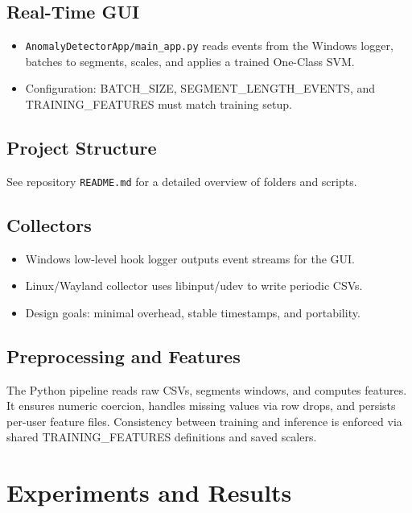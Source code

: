 \documentclass[
  12pt,
]{article}
\providecommand{\tightlist}{%
  \setlength{\itemsep}{0pt}\setlength{\parskip}{0pt}}
\begin{document}
\subsection{Real-Time GUI}\label{real-time-gui}

\begin{itemize}
\tightlist
\item
  \texttt{AnomalyDetectorApp/main\_app.py} reads events from the Windows
  logger, batches to segments, scales, and applies a trained One-Class
  SVM.
\item
  Configuration: BATCH\_SIZE, SEGMENT\_LENGTH\_EVENTS, and
  TRAINING\_FEATURES must match training setup.
\end{itemize}

\subsection{Project Structure}\label{project-structure}

See repository \texttt{README.md} for a detailed overview of folders and
scripts.

\subsection{Collectors}\label{collectors}

\begin{itemize}
\tightlist
\item
  Windows low-level hook logger outputs event streams for the GUI.
\item
  Linux/Wayland collector uses libinput/udev to write periodic CSVs.
\item
  Design goals: minimal overhead, stable timestamps, and portability.
\end{itemize}

\subsection{Preprocessing and
Features}\label{preprocessing-and-features}

The Python pipeline reads raw CSVs, segments windows, and computes
features. It ensures numeric coercion, handles missing values via row
drops, and persists per-user feature files. Consistency between training
and inference is enforced via shared TRAINING\_FEATURES definitions and
saved scalers.

\section{Experiments and Results}\label{experiments-and-results}
\end{document}
